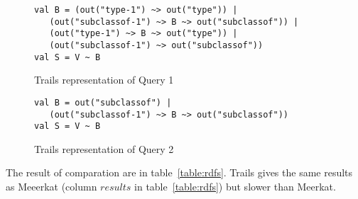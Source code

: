 \begin{figure}[h]
\begin{lstlisting}
val B = (out("type-1") ~> out("type")) |
   (out("subclassof-1") ~> B ~> out("subclassof")) |
   (out("type-1") ~> B ~> out("type")) |
   (out("subclassof-1") ~> out("subclassof"))
val S = V ~ B
\end{lstlisting}
\caption{Trails representation of Query 1}
\label{fig:query1Trails}
\end{figure}

\begin{figure}[h]
\begin{lstlisting}
val B = out("subclassof") |
   (out("subclassof-1") ~> B ~> out("subclassof"))
val S = V ~ B
\end{lstlisting}
\caption{Trails representation of Query 2}
\label{fig:query2Trails}
\end{figure}

The result of comparation are in table~\ref{table:rdfs}.
Trails gives the same results as Meeerkat (column $results$ in table~\ref{table:rdfs}) but slower than Meerkat.


